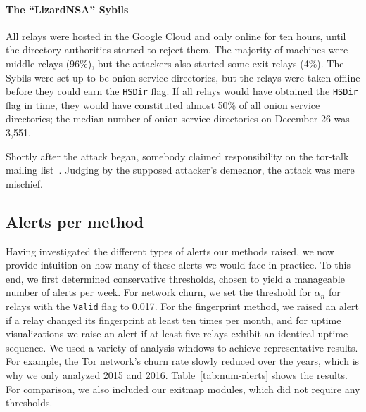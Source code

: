 \paragraph{The ``LizardNSA'' Sybils}
All relays were hosted in the Google Cloud and only online for ten hours, until
the directory authorities started to reject them.  The majority of machines were
middle relays (96\%), but the attackers also started some exit relays (4\%).
The Sybils were set up to be onion service directories, but the relays were
taken offline before they could earn the \texttt{HSDir} flag.  If all relays
would have obtained the \texttt{HSDir} flag in time, they would have constituted
almost 50\% of all onion service directories; the median number of onion
service directories on December 26 was 3,551.

Shortly after the attack began, somebody claimed responsibility on the tor-talk
mailing list~\cite{lizards}.  Judging by the supposed attacker's demeanor, the
attack was mere mischief.

\subsection{Alerts per method}
\label{sec:numalerts}
Having investigated the different types of alerts our methods raised, we now
provide intuition on how many of these alerts we would face in practice.  To
this end, we first determined conservative thresholds, chosen to yield a
manageable number of alerts per week.  For network churn, we set the threshold
for $\alpha_n$ for relays with the \texttt{Valid} flag to 0.017.  For the
fingerprint method, we raised an alert if a relay changed its fingerprint at
least ten times per month, and for uptime visualizations we raise an alert if at
least five relays exhibit an identical uptime sequence.  We used a variety of
analysis windows to achieve representative results.  For example, the Tor
network's churn rate slowly reduced over the years, which is why we only
analyzed 2015 and 2016.  Table~\ref{tab:num-alerts} shows the results.  For
comparison, we also included our exitmap modules, which did not require any
thresholds.

